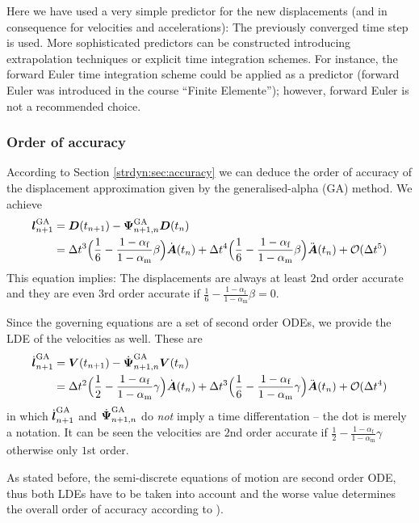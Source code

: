 Here we have used a very simple predictor for the new displacements (and in
consequence for velocities and accelerations): The previously converged time
step is used.  More sophisticated
predictors can be constructed introducing extrapolation techniques or
explicit time integration schemes. For instance, the forward
Euler time integration scheme could be applied as a predictor (forward Euler
was introduced in the course ``Finite Elemente''); however, forward Euler is
not a recommended choice.

\subsubsection{Order of accuracy}
According to Section \ref{strdyn:sec:accuracy} we can deduce the order of accuracy of the displacement approximation given by the generalised-alpha (GA) method. We achieve
\begin{align}
   \boldsymbol{l}_{n+1}^{\text{GA}}
&  = \boldsymbol{D}(t_{n+1}) - \boldsymbol{\Psi}_{n+1,n}^{\text{GA}} \boldsymbol{D}(t_n)
\\
&  = \Delta t^3 \Big( \frac{1}{6} - \frac{1-\alpha_\text{f}}{1-\alpha_\text{m}} \beta \Big) 
   \dot{\boldsymbol{A}}(t_n)
   + \Delta t^4 \Big( \frac{1}{6} - \frac{1-\alpha_\text{f}}{1-\alpha_\text{m}} \beta \Big)  
   \ddot{\boldsymbol{A}}(t_n) 
   + \mathcal{O}(\Delta t^5)
\end{align}
This equation implies: The displacements are always at least $2$nd order accurate and they are even $3$rd order accurate if $\frac{1}{6} - \frac{1-\alpha_\text{f}}{1-\alpha_\text{m}} \beta = 0$. 

Since the governing equations are a set of second order ODEs, we provide the LDE of the velocities as well. These are
\begin{align}
   \dot{\boldsymbol{l}}_{n+1}^{\text{GA}}
&  = \boldsymbol{V}(t_{n+1}) - \dot{\boldsymbol{\Psi}}_{n+1,n}^{\text{GA}} \boldsymbol{V}(t_n)
\\
&  = \Delta t^2 \Big( \frac{1}{2} - \frac{1-\alpha_\text{f}}{1-\alpha_\text{m}} \gamma \Big) 
   \dot{\boldsymbol{A}}(t_n)
   + \Delta t^3 \Big( \frac{1}{6} - \frac{1-\alpha_\text{f}}{1-\alpha_\text{m}} \gamma \Big)  
   \ddot{\boldsymbol{A}}(t_n) 
   + \mathcal{O}(\Delta t^4)
\end{align}
in which $\dot{\boldsymbol{l}}_{n+1}^{\text{GA}}$ and $\dot{\boldsymbol{\Psi}}_{n+1,n}^{\text{GA}}$ do \emph{not} imply a time differentation -- the dot is merely a notation. It can be seen the velocities are $2$nd order accurate if $\frac{1}{2} - \frac{1-\alpha_\text{f}}{1-\alpha_\text{m}} \gamma$ otherwise only $1$st order.

As stated before, the semi-discrete equations of motion are second order ODE, thus both LDEs have to be taken into account and the worse value determines the overall order of accuracy according to  \etal{} \cite{hairer87, hairer91}). 

